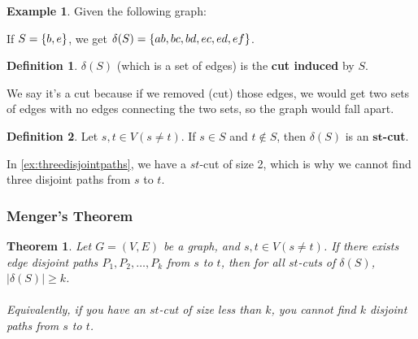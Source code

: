 \documentclass[]{article}
\newtheorem*{theorem}{Theorem}
\theoremstyle{definition}
\newtheorem*{defn}{Definition}
\newtheorem{ex}{Example}[section]
\DeclarePairedDelimiter{\set}{\lbrace}{\rbrace}
\begin{document}
			\begin{ex}
				Given the following graph:
				\begin{center}
				\end{center}
				
				If $S = \set{b, e}$, we get $\delta(S) = \set{ab, bc, bd, ec, ed, ef}$.
			\end{ex}
			
			\begin{defn}
				$\delta(S)$ (which is a set of edges) is the \textbf{cut induced} by $S$.
			\end{defn}
			
			We say it's a cut because if we removed (cut) those edges, we would get two sets of edges with no edges connecting the two sets, so the graph would fall apart.
			
			\begin{defn}
				Let $s, t \in V (s \ne t)$. If $s \in S$ and $t \not \in S$, then $\delta(S)$ is an \textbf{$\mathbf{st}$-cut}.
			\end{defn}
			
			In \ref{ex:threedisjointpaths}, we have a $st$-cut of size 2, which is why we cannot find three disjoint paths from $s$ to $t$.

			\subsubsection{Menger's Theorem}
				\begin{theorem}
					Let $G = (V, E)$ be a graph, and $s, t \in V (s \ne t)$. If there exists edge disjoint paths $P_1, P_2, \ldots, P_k$ from $s$ to $t$, then for all $st$-cuts of $\delta(S)$, $|\delta(S)| \ge k$.
					\\ \\
					Equivalently, if you have an $st$-cut of size less than $k$, you cannot find $k$ disjoint paths from $s$ to $t$.
				\end{theorem}
			
\end{document}
